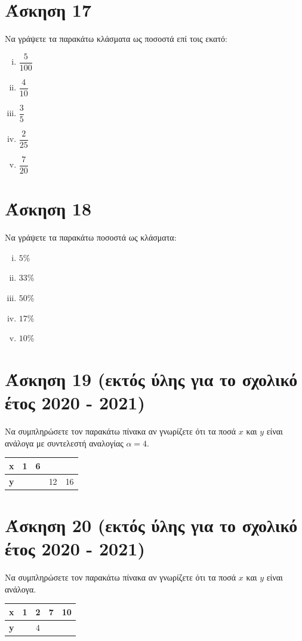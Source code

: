 \documentclass[a4paper,10pt]{report}
\begin{document}
\section*{Άσκηση 17  \hfill \small{}}
Να γράψετε τα παρακάτω κλάσματα ως ποσοστά επί τοις εκατό:
\begin{enumerate}[i)]
 \item $\dfrac{5}{100}$
 \item $\dfrac{4}{10}$
 \item $\dfrac{3}{5}$
 \item $\dfrac{2}{25}$
 \item $\dfrac{7}{20}$
\end{enumerate}

\section*{Άσκηση 18  \hfill \small{}}
Να γράψετε τα παρακάτω  ποσοστά ως κλάσματα:
\begin{enumerate}[i)]
 \item $5\%$
 \item $33\%$
 \item $50\%$
 \item $17\%$
 \item $10\%$
\end{enumerate}

\section*{Άσκηση 19 (εκτός ύλης για το σχολικό έτος 2020 - 2021) \hfill \small{}}
Να συμπληρώσετε τον παρακάτω πίνακα αν γνωρίζετε ότι τα ποσά $x$ και $y$ είναι ανάλογα με συντελεστή αναλογίας $α=4$.
\begin{center}
\begin{tabular}{|c|c|c|c|l|}\hline
\textbf{x} & 1 & 6 &    &  \\\hline
\textbf{y} &   &   & 12 & 16\\\hline
\end{tabular}
\end{center}

\section*{Άσκηση 20 (εκτός ύλης για το σχολικό έτος 2020 - 2021) \hfill \small{}}
Να συμπληρώσετε τον παρακάτω πίνακα αν γνωρίζετε ότι τα ποσά $x$ και $y$ είναι ανάλογα.
\begin{center}
\begin{tabular}{|c|c|c|c|l|}\hline
\textbf{x} & 1 & 2 & 7 & 10 \\\hline
\textbf{y} &   & 4 &   & \\\hline
\end{tabular}
\end{center}
\end{document}
